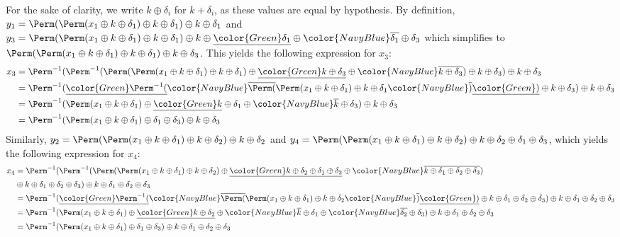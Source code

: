 For the sake of clarity, we write $k \oplus \delta_i$ for $k + \delta_i$, as these values are equal by hypothesis.
By definition,
$y_1 = \Perm(\Perm(x_1 \oplus k \oplus \delta_1) \oplus k \oplus \delta_1) \oplus k \oplus \delta_1$ and
$y_3 = \Perm(\Perm(x_1 \oplus k \oplus \delta_1) \oplus k \oplus \delta_1) \oplus k \oplus \underline{\color{Green}\delta_1} \oplus {\color{NavyBlue}\overline{\delta_1}} \oplus \delta_3$
which simplifies to
$\Perm(\Perm(x_1 \oplus k \oplus \delta_1) \oplus k \oplus \delta_1) \oplus k \oplus \delta_3$. This yields the following
expression for $x_3$:
\begin{align*}
x_3 &= \Perm^{-1}(\Perm^{-1}(\Perm(\Perm(x_1 \oplus k \oplus \delta_1) \oplus k \oplus \delta_1) \oplus \underline{\color{Green}k \oplus \delta_3} \oplus {\color{NavyBlue}\overline{k \oplus \delta_3}})
\oplus k \oplus \delta_3) \oplus k \oplus \delta_3 \\
&= \Perm^{-1}(\underline{\color{Green}\Perm^{-1}(}{\color{NavyBlue}\overline{\Perm(}}\Perm(x_1 \oplus k \oplus \delta_1) \oplus k \oplus \delta_1{\color{NavyBlue}\overline{)}}\underline{\color{Green})}
\oplus k \oplus \delta_3) \oplus k \oplus \delta_3 \\
&= \Perm^{-1}(\Perm(x_1 \oplus k \oplus \delta_1) \oplus \underline{\color{Green}k} \oplus \delta_1 \oplus {\color{NavyBlue}\overline{k}} \oplus \delta_3) \oplus k \oplus \delta_3 \\
&= \Perm^{-1}(\Perm(x_1 \oplus k \oplus \delta_1) \oplus \delta_1 \oplus \delta_3) \oplus k \oplus \delta_3
\end{align*}
Similarly,
$y_2 = \Perm(\Perm(x_1 \oplus k \oplus \delta_1) \oplus k \oplus \delta_2) \oplus k \oplus \delta_2$ and
$y_4 = \Perm(\Perm(x_1 \oplus k \oplus \delta_1) \oplus k \oplus \delta_2) \oplus k \oplus \delta_2 \oplus \delta_1 \oplus \delta_3$, which
yields the following expression for $x_4$:
\begin{align*}
x_4 &=  \Perm^{-1}(\Perm^{-1}(\Perm(\Perm(x_1 \oplus k \oplus \delta_1) \oplus k \oplus \delta_2) \oplus \underline{\color{Green}k \oplus \delta_2 \oplus \delta_1
\oplus \delta_3} \oplus {\color{NavyBlue}\overline{k \oplus \delta_1 \oplus \delta_2 \oplus \delta_3}}) \\
&\oplus k \oplus \delta_1 \oplus \delta_2 \oplus \delta_3) \oplus k \oplus \delta_1 \oplus \delta_2 \oplus \delta_3\\
&= \Perm^{-1}(\underline{\color{Green}\Perm^{-1}(}{\color{NavyBlue}\overline{\Perm(}}\Perm(x_1 \oplus k \oplus \delta_1) \oplus k \oplus \delta_2{\color{NavyBlue}\overline{)}}\underline{\color{Green})}
\oplus k \oplus \delta_1 \oplus \delta_2
\oplus \delta_3) \oplus k \oplus \delta_1 \oplus \delta_2 \oplus \delta_3 \\
&= \Perm^{-1}(\Perm(x_1 \oplus k \oplus \delta_1) \oplus \underline{\color{Green}k \oplus \delta_2} \oplus {\color{NavyBlue}\overline{k}} \oplus \delta_1 \oplus {\color{NavyBlue}\overline{\delta_2}} \oplus
\delta_3) \oplus k \oplus \delta_1 \oplus \delta_2 \oplus \delta_3\\
&= \Perm^{-1}(\Perm(x_1 \oplus k \oplus \delta_1) \oplus \delta_1 \oplus \delta_3) \oplus k \oplus \delta_1 \oplus \delta_2 \oplus \delta_3
\end{align*}
